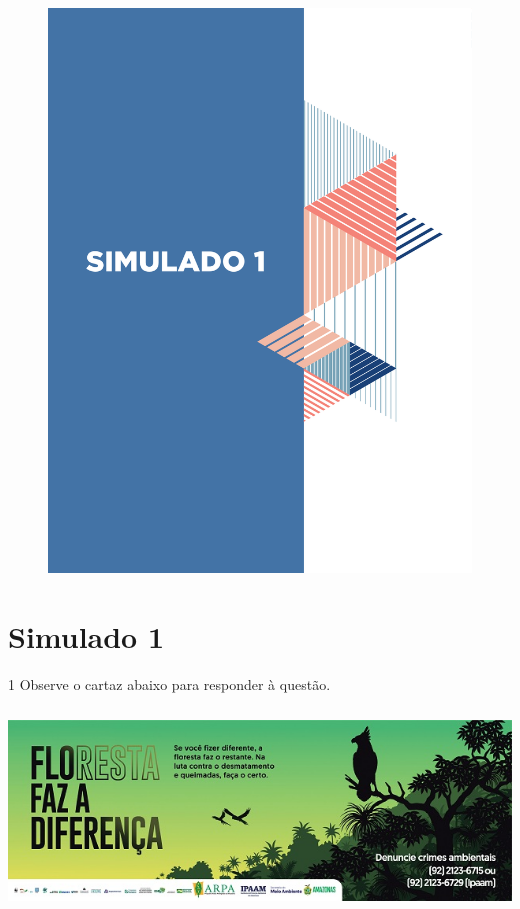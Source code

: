 \pagebreak

\mbox{}

\begin{figure}
\vspace*{-3cm}
\hspace*{-3.7cm}\includegraphics[scale=1]{../watermarks/1simulado9ano.pdf}
\end{figure}


\pagebreak

\section*{Simulado 1}

\num{1} Observe o cartaz abaixo para responder à questão.

\includegraphics[width=5.90551in,height=2.125in]{./imgSAEB_7_POR/media/image16.png}

